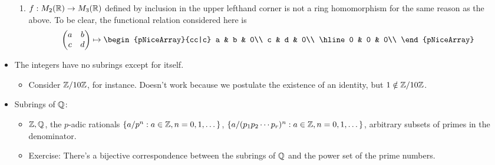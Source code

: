\documentclass[../notes.tex]{subfiles}
\begin{document}
\begin{itemize}
\begin{enumerate}
        \item $f:M_2(\mathbb{R})\to M_3(\mathbb{R})$ defined by inclusion in the upper lefthand corner is not a ring homomorphism for the same reason as the above. To be clear, the functional relation considered here is
        \begin{equation*}
            \begin{pmatrix}
                a & b\\
                c & d\\
            \end{pmatrix}
            \mapsto
            \begin{pNiceArray}{cc|c}
                a & b & 0\\
                c & d & 0\\ \hline
                0 & 0 & 0\\
            \end{pNiceArray}
        \end{equation*}
    \end{enumerate}
    \item The integers have no subrings except for itself.
    \begin{itemize}
        \item Consider $\mathbb{Z}/10\mathbb{Z}$, for instance. Doesn't work because we postulate the existence of an identity, but $1\notin\mathbb{Z}/10\mathbb{Z}$.
    \end{itemize}
    \item Subrings of $\mathbb{Q}$:
    \begin{itemize}
        \item $\mathbb{Z},\mathbb{Q}$, the $p$-adic rationals $\{a/p^n:a\in\mathbb{Z},n=0,1,\dots\}$, $\{a/(p_1p_2\cdots p_r)^n:a\in\mathbb{Z},n=0,1,\dots\}$, arbitrary subsets of primes in the denominator.
        \item Exercise: There's a bijective correspondence between the subrings of $\mathbb{Q}$ and the power set of the prime numbers.
    \end{itemize}
\end{itemize}
\end{document}

